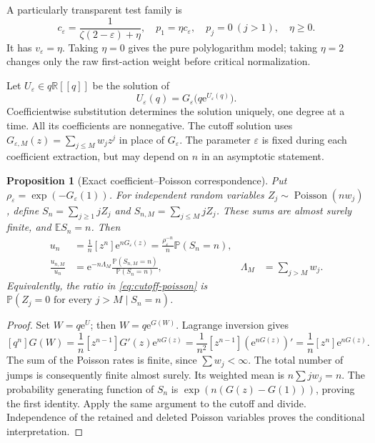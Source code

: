 \documentclass[11pt,a4paper]{article}
\numberwithin{equation}{section}
\newtheorem{proposition}[theorem]{Proposition}
\theoremstyle{definition}
\theoremstyle{remark}
\newcommand{\eps}{\varepsilon}
\newcommand{\E}{\mathbb E}
\newcommand{\Pp}{\mathbb P}
\newcommand{\R}{\mathbb R}
\newcommand{\ee}{\mathrm e}
\begin{document}
A particularly transparent test family is
\begin{equation}
 c_{\eps}=\frac{1}{\zeta(2-\eps)+\eta},\quad
 p_1=\eta c_{\eps},\quad p_j=0\ (j>1),\quad \eta\ge0.
 \label{eq:test-family}
\end{equation}
It has \(v_{\eps}=\eta\). Taking \(\eta=0\) gives the pure polylogarithm
model; taking \(\eta=2\) changes only the raw first-action weight before
critical normalization.

Let \(U_{\eps}\in q\R[[q]]\) be the solution of
\begin{equation}
 U_{\eps}(q)=G_{\eps}\bigl(q\ee^{U_{\eps}(q)}\bigr).
 \label{eq:feedback}
\end{equation}
Coefficientwise substitution determines the solution uniquely, one degree
at a time. All its coefficients are nonnegative. The cutoff solution uses
\(G_{\eps,M}(z)=\sum_{j\le M}w_jz^j\) in place of \(G_{\eps}\).
The parameter \(\eps\) is fixed during each coefficient extraction, but may
depend on \(n\) in an asymptotic statement.

\begin{proposition}[Exact coefficient--Poisson correspondence]
\label{prop:poisson}
Put \(\rho_{\eps}=\exp(-G_{\eps}(1))\). For independent random variables
\(Z_j\sim\operatorname{Poisson}(nw_j)\), define
\(S_n=\sum_{j\ge1}jZ_j\) and \(S_{n,M}=\sum_{j\le M}jZ_j\).
These sums are almost surely finite, and \(\E S_n=n\). Then
\begin{align}
 u_n&=\frac1n[z^n]\ee^{nG_{\eps}(z)}
     =\frac{\rho_{\eps}^{-n}}n\Pp(S_n=n),\label{eq:coeff-poisson}\\
 \frac{u_{n,M}}{u_n}
 &=\ee^{-n\Lambda_M}
   \frac{\Pp(S_{n,M}=n)}{\Pp(S_n=n)},
 &\Lambda_M&=\sum_{j>M}w_j.\label{eq:cutoff-poisson}
\end{align}
Equivalently, the ratio in \eqref{eq:cutoff-poisson} is
\(\Pp(Z_j=0\text{ for every }j>M\mid S_n=n)\).
\end{proposition}
\begin{proof}
Set \(W=q\ee^{U}\); then \(W=q\ee^{G(W)}\). Lagrange inversion gives
\[
 [q^n]G(W)=\frac1n[z^{n-1}]G'(z)\ee^{nG(z)}
 =\frac1{n^2}[z^{n-1}](\ee^{nG(z)})'
 =\frac1n[z^n]\ee^{nG(z)}.
\]
The sum of the Poisson rates is finite, since \(\sum w_j<\infty\).
The total number of jumps is consequently finite almost surely. Its weighted
mean is \(n\sum jw_j=n\). The probability generating function of \(S_n\)
is \(\exp(n(G(z)-G(1)))\), proving the first identity. Apply the same
argument to the cutoff and divide. Independence of the retained and deleted
Poisson variables proves the conditional interpretation.
\end{proof}
\end{document}
